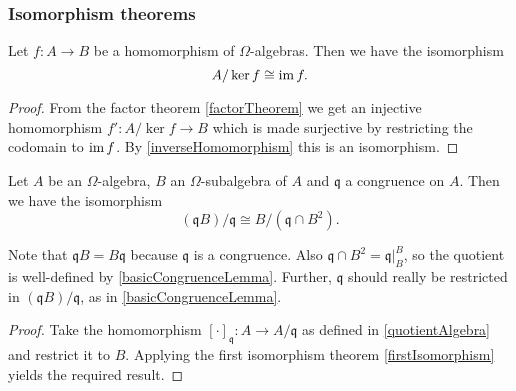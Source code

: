 \subsubsection{Isomorphism theorems}
\begin{theorem} \label{firstIsomorphism}
Let $f:A\to B$ be a homomorphism of $\Omega$-algebras. Then we have the isomorphism
\[ A/\ker f \cong \operatorname{im} f. \]
\end{theorem}
\begin{proof}
From the factor theorem \ref{factorTheorem} we get an injective homomorphism $f': A/\ker f \to B$ which is made surjective by restricting the codomain to $\operatorname{im} f$. By \ref{inverseHomomorphism} this is an isomorphism.
\end{proof}

\begin{theorem}
Let $A$ be an $\Omega$-algebra, $B$ an $\Omega$-subalgebra of $A$ and $\mathfrak{q}$ a congruence on $A$. Then we have the isomorphism
\[ (\mathfrak{q}B)/\mathfrak{q} \cong B/(\mathfrak{q}\cap B^2). \]
\end{theorem}
Note that $\mathfrak{q}B = B\mathfrak{q}$ because $\mathfrak{q}$ is a congruence. Also $\mathfrak{q}\cap B^2 = \mathfrak{q}|_B^B$, so the quotient is well-defined by \ref{basicCongruenceLemma}. Further, $\mathfrak{q}$ should really be restricted in $(\mathfrak{q}B)/\mathfrak{q}$, as in \ref{basicCongruenceLemma}.
\begin{proof}
Take the homomorphism $[\cdot]_\mathfrak{q}:A \to A/\mathfrak{q}$ as defined in \ref{quotientAlgebra} and restrict it to $B$. Applying the first isomorphism theorem \ref{firstIsomorphism} yields the required result.
\end{proof}

